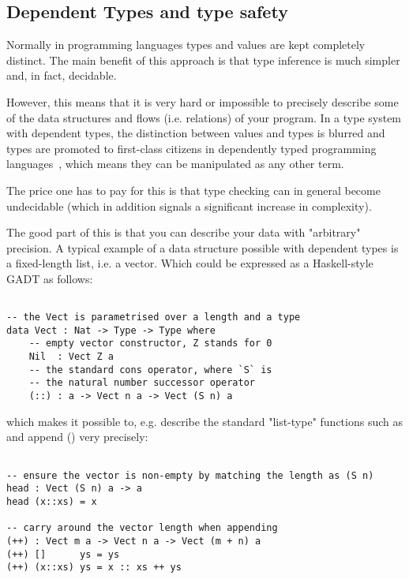 \subsection{Dependent Types and type safety}

Normally in programming languages types and values are kept completely
distinct. The main benefit of this approach is that type inference is much
simpler and, in fact, decidable.

However, this means that it is very hard or impossible to precisely
describe some of the data structures and flows (i.e. relations) of your
program. In a type system with dependent types, the distinction between values
and types is blurred and types are promoted to first-class citizens in
dependently typed programming languages~\cite[p.~3]{idris-tutorial}, which
means they can be manipulated as any other term.

The price one has to pay for this is that type checking can in general become
undecidable (which in addition signals a significant increase in complexity).

The good part of this is that you can describe your data with "arbitrary"
precision. A typical example of a data structure possible with dependent types
is a fixed-length list, i.e. a vector. Which could be expressed as
a Haskell-style GADT as follows:

\begin{BVerbatim}

-- the Vect is parametrised over a length and a type
data Vect : Nat -> Type -> Type where
    -- empty vector constructor, Z stands for 0
    Nil  : Vect Z a
    -- the standard cons operator, where `S` is
    -- the natural number successor operator
    (::) : a -> Vect n a -> Vect (S n) a

\end{BVerbatim}

which makes it possible to, e.g. describe the standard "list-type" functions
such as  and append (\code{++}) very precisely:

\begin{BVerbatim}

-- ensure the vector is non-empty by matching the length as (S n)
head : Vect (S n) a -> a
head (x::xs) = x

-- carry around the vector length when appending
(++) : Vect m a -> Vect n a -> Vect (m + n) a
(++) []      ys = ys
(++) (x::xs) ys = x :: xs ++ ys

\end{BVerbatim}

